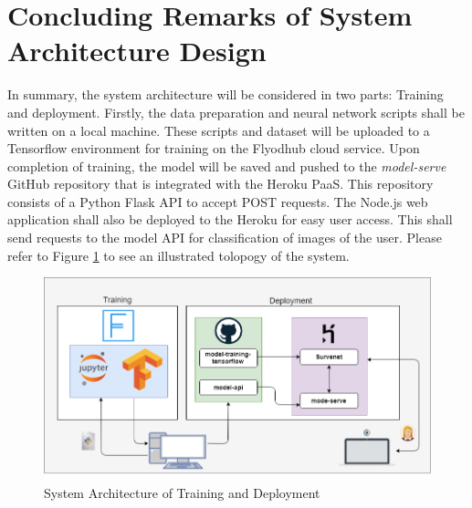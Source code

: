 \section{Concluding Remarks of System Architecture Design}
In summary, the system architecture will be considered in two parts: Training and deployment. Firstly, the data preparation and neural network scripts shall be written on a local machine. These scripts and dataset will be uploaded to a Tensorflow environment for training on the Flyodhub cloud service. Upon completion of training, the model will be saved and pushed to the \textit{model-serve} GitHub repository that is integrated with the Heroku PaaS. This repository consists of a Python Flask API to accept POST requests. The Node.js web application shall also be deployed to the Heroku for easy user access. This shall send requests to the model API for classification of images of the user.
Please refer to Figure \ref{arch} to see an illustrated tolopogy of the system.

\begin{figure}[ht]
	\begin{center}
		\advance\leftskip-3cm
		\advance\rightskip-3cm
		\includegraphics[keepaspectratio=true,scale=0.55]{__resources/Design/arch.png}
		\caption{System Architecture of Training and Deployment}
		\label{arch}
	\end{center}
\end{figure}

